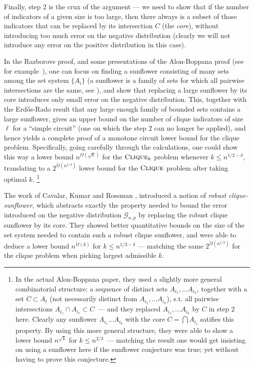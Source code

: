 \documentclass[10pt,a4paper]{article}
\newcommand{\ErdosRado}{Erdős-Rado }
\newcommand{\cliquep}{\textsc{Clique}}
\begin{document}
Finally, step 2 is the crux of the argument --- we need to show that if the number of indicators of a given size is too large, then there always is a subset of those indicators that can be replaced by its intersection $C$ (the \emph{core}), without introducing too much error on the negative distribution (clearly we will not introduce any error on the positive distribution in this case). 

In the Razborovs proof, and some presentations of the Alon-Boppana proof (see for example~\cite[Chapter 9]{jukna2012boolean}), one can focus on finding a sunflower consisting of many sets among the set system $\{A_i\}$ (a sunflower is a family of sets for which all pairwise intersections are the same, see ), and show that replacing a large sunflower by its core introduces only small error on the negative distribution. This, together with the \ErdosRado result that any large enough family of bounded sets contains a large sunflower, gives an upper bound on the number of clique indicators of size $\ell$ for a ``simple circuit'' (one on which the step 2 can no longer be applied), and hence yields a complete proof of a monotone circuit lower bound for the clique problem. Specifically, going carefully through the calculations, one could show this way a lower bound $n^{\Omega(\sqrt{k})}$ for the $\cliquep_k$ problem whenever $k \leq n^{1/2 - \delta}$, translating to a $2^{\tilde{\Omega}(n^{1/4})}$ lower bound for the $\cliquep$ problem after taking optimal $k$.
\footnote{In the actual Alon-Boppana paper, they used a slightly more general combinatorial structure: a sequence of distinct sets $A_{i_1}, \ldots A_{i_k}$, together with a set $C \subset A_t$ (not necessarily distinct from $A_{i_1}, \ldots A_{i_k}$), s.t. all pairwise intersections $A_{i_s} \cap A_{i_r} \subset C$~--- and they replaced $A_{i_1}, \ldots A_{i_k}$ by $C$ in step 2 here. Clearly any sunflower $A_{i_1} \ldots A_{i_k}$ with the core $C = \bigcap A_{i_j}$ satifies this property. By using this more general structure, they were able to show a lower bound $n^{\sqrt{k}}$ for $k\leq n^{2/3}$~--- matching the result one would get insisting on using a sunflower here if the sunflower conjecture was true; yet without having to prove this conjecture. }

The work of Cavalar, Kumar and Rossman \cite{cavalar2022}, introduced a notion of \emph{robust clique-sunflower}, which abstracts exactly the property needed to bound the error introduced on the negative distribution $\mathcal{G}_{n,p}$  by replacing the robust clique sunflower by its core. They showed better quantitative bounds on the size of the set system needed to contain such a robust clique sunflower, and were able to deduce a lower bound $n^{\tilde{\Omega}(k)}$ for $k \leq n^{1/3 - \delta}$ --- matching the same $2^{\tilde\Omega(n^{1/3})}$ for the clique problem when picking largest admissible $k$.
\end{document}
